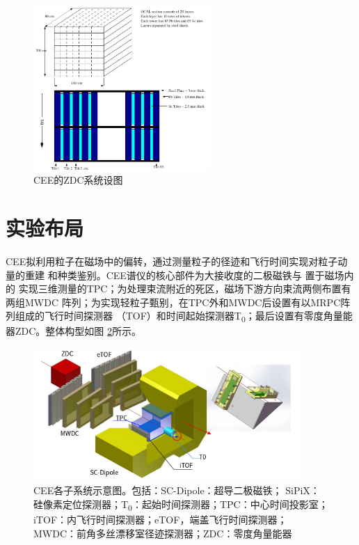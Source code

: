 \documentclass[bachelor,openany,oneside,color]{buaathesis}
\def\TZ{T\textsubscript{0}}
\begin{document}
\begin{figure}
	\centering
	\includegraphics[width=0.6\textwidth]{./resource/CEE-ZDC.png}
	\caption{CEE的ZDC系统设图}
	\label{fig:det:ZDC}
\end{figure}

\section{实验布局}

CEE拟利用粒子在磁场中的偏转，通过测量粒子的径迹和飞行时间实现对粒子动量的重建
和种类鉴别。\cite{Lyu:ConceptDesign}CEE谱仪的核心部件为大接收度的二极磁铁与
置于磁场内的
实现三维测量的TPC；为处理束流附近的死区，磁场下游方向束流两侧布置有两组MWDC
阵列；为实现轻粒子甄别，在TPC外和MWDC后设置有以MRPC阵列组成的飞行时间探测器
（TOF）和时间起始探测器\TZ；最后设置有零度角量能器ZDC。整体构型如图
\ref{fig:CEE:Subsystem}所示。

\begin{figure}\centering
	\includegraphics[width=0.9\textwidth]{./resource/CEE-Subsystem.png}
	\captionsetup{width=0.9\textwidth}
	\caption{CEE各子系统示意图。包括：SC-Dipole：超导二极磁铁；
		SiPiX：硅像素定位探测器；\TZ：起始时间探测器；TPC：中心时间投影室；
		iTOF：内飞行时间探测器；eTOF，端盖飞行时间探测器；
		MWDC：前角多丝漂移室径迹探测器；ZDC：零度角量能器
		\cite{Lyu:ConceptDesign}}
	\label{fig:CEE:Subsystem}
\end{figure}
\end{document}
